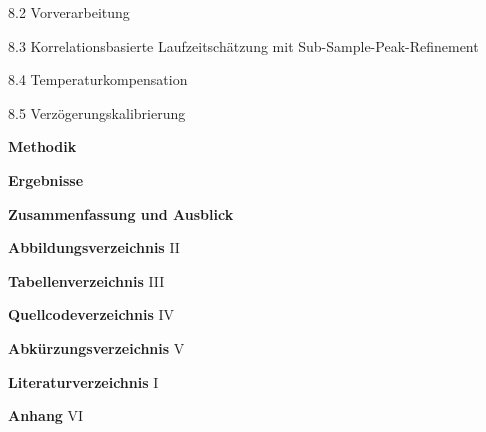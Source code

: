 \documentclass[a4paper,12pt,headsepline]{scrartcl}
\begin{document}
\noindent
\hspace{1cm} 8.2 Vorverarbeitung 

\noindent
\hspace{1cm} 8.3 Korrelationsbasierte Laufzeitschätzung mit Sub-Sample-Peak-Refinement 

\noindent
\hspace{1cm} 8.4 Temperaturkompensation 

\noindent
\hspace{1cm} 8.5 Verzögerungskalibrierung 

\vspace{0.5cm}
\noindent
\textbf{Methodik} 



\vspace{0.5cm}
\noindent
\textbf{Ergebnisse} 

%

\vspace{0.5cm}
\noindent
\textbf{Zusammenfassung und Ausblick} 

\vspace{0.8cm}
\noindent
\textbf{Abbildungsverzeichnis} \dotfill II

\noindent
\textbf{Tabellenverzeichnis} \dotfill III

\noindent
\textbf{Quellcodeverzeichnis} \dotfill IV

\noindent
\textbf{Abkürzungsverzeichnis} \dotfill V

\noindent
\textbf{Literaturverzeichnis} \dotfill I

\noindent
\textbf{Anhang} \dotfill VI

\newpage
\listoffigures



\newpage
\listoftables

\newpage
\renewcommand*{\listlistingname}{Quellcodeverzeichnis}
\listoflistings %
\end{document}
